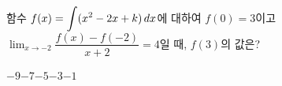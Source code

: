 함수 $f(x)=\displaystyle\int (x^2-2x+k)\mkern3mu dx$에 대하여 $f(0)=3$이고 $\displaystyle\lim_{x\to -2}\dfrac{f(x)-f(-2)}{x+2}=4$일 때, $f(3)$의 값은? 
\begin{choices32}{$-9$}{$-7$}{$-5$}{$-3$}{$-1$}\end{choices32}
